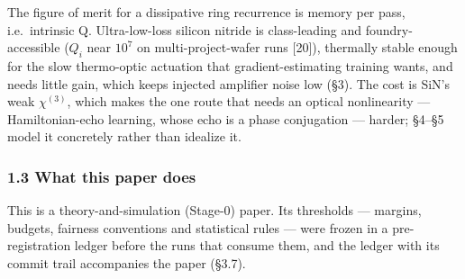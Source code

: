 \documentclass[
  10pt,
]{article}
\begin{document}
The figure of merit for a dissipative ring recurrence is memory per
pass, i.e.~intrinsic Q. Ultra-low-loss silicon nitride is class-leading
and foundry-accessible (\(Q_i\) near \(10^7\) on multi-project-wafer
runs {[}20{]}), thermally stable enough for the slow thermo-optic
actuation that gradient-estimating training wants, and needs little
gain, which keeps injected amplifier noise low (§3). The cost is SiN's
weak \(\chi^{(3)}\), which makes the one route that needs an optical
nonlinearity --- Hamiltonian-echo learning, whose echo is a phase
conjugation --- harder; §4--§5 model it concretely rather than idealize
it.

\subsubsection{1.3 What this paper does}\label{what-this-paper-does}

This is a theory-and-simulation (Stage-0) paper. Its thresholds ---
margins, budgets, fairness conventions and statistical rules --- were
frozen in a pre-registration ledger before the runs that consume them,
and the ledger with its commit trail accompanies the paper (§3.7).
\end{document}
